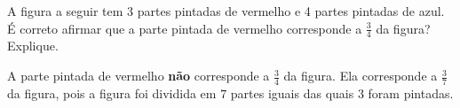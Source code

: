 \documentclass[10 pt,usenames,dvipsnames, oneside]{article}
\begin{document}
A figura a seguir tem 3 partes pintadas de vermelho e 4 partes pintadas de azul. É correto afirmar que a parte pintada de vermelho corresponde a $\frac{3}{4}$ da figura? Explique.
\begin{center}
\end{center}

\ifdefined\prof

\begin{solucao}

A parte pintada de vermelho   {\bf não}   corresponde a   $\frac{3}{4}$ da figura. Ela corresponde a $\frac{3}{7}$ da figura, pois a figura foi dividida em   $7$ partes iguais das quais $3$ foram pintadas.

\end{solucao}
\fi
\end{document}
